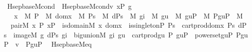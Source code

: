 \begin{isabellebody}
\ Hsep{\isacharunderscore}{\kern0pt}base{\isacharunderscore}{\kern0pt}M{\isacharunderscore}{\kern0pt}cond\ \ {\isachardoublequoteopen}Hsep{\isacharunderscore}{\kern0pt}base{\isacharunderscore}{\kern0pt}M{\isacharunderscore}{\kern0pt}cond{\isacharparenleft}{\kern0pt}v{\isacharcomma}{\kern0pt}\ xP{\isacharcomma}{\kern0pt}\ g{\isacharparenright}{\kern0pt}\ {\isasymequiv}\isanewline
\ \ \ {\isasymexists}x\ {\isasymin}\ M{\isachardot}{\kern0pt}\ {\isasymexists}P\ {\isasymin}\ M{\isachardot}{\kern0pt}\ {\isasymexists}domx\ {\isasymin}\ M{\isachardot}{\kern0pt}\ {\isasymexists}Ps\ {\isasymin}\ M{\isachardot}{\kern0pt}\ {\isasymexists}dPs\ {\isasymin}\ M{\isachardot}{\kern0pt}\ {\isasymexists}gi\ {\isasymin}\ M{\isachardot}{\kern0pt}\ {\isasymexists}gu\ {\isasymin}\ M{\isachardot}{\kern0pt}\ {\isasymexists}guP\ {\isasymin}\ M{\isachardot}{\kern0pt}\ {\isasymexists}PguP\ {\isasymin}\ M{\isachardot}{\kern0pt}\ \isanewline
\ \ pair{\isacharparenleft}{\kern0pt}{\isacharhash}{\kern0pt}{\isacharhash}{\kern0pt}M{\isacharcomma}{\kern0pt}\ x{\isacharcomma}{\kern0pt}\ P{\isacharcomma}{\kern0pt}\ xP{\isacharparenright}{\kern0pt}\ {\isasymand}\ is{\isacharunderscore}{\kern0pt}domain{\isacharparenleft}{\kern0pt}{\isacharhash}{\kern0pt}{\isacharhash}{\kern0pt}M{\isacharcomma}{\kern0pt}\ x{\isacharcomma}{\kern0pt}\ domx{\isacharparenright}{\kern0pt}\ {\isasymand}\ is{\isacharunderscore}{\kern0pt}singleton{\isacharprime}{\kern0pt}{\isacharparenleft}{\kern0pt}P{\isacharcomma}{\kern0pt}\ Ps{\isacharparenright}{\kern0pt}\ {\isasymand}\ cartprod{\isacharprime}{\kern0pt}{\isacharparenleft}{\kern0pt}domx{\isacharcomma}{\kern0pt}\ Ps{\isacharcomma}{\kern0pt}\ dPs{\isacharparenright}{\kern0pt}\ {\isasymand}\ image{\isacharparenleft}{\kern0pt}{\isacharhash}{\kern0pt}{\isacharhash}{\kern0pt}M{\isacharcomma}{\kern0pt}\ g{\isacharcomma}{\kern0pt}\ dPs{\isacharcomma}{\kern0pt}\ gi{\isacharparenright}{\kern0pt}\ {\isasymand}\ big{\isacharunderscore}{\kern0pt}union{\isacharparenleft}{\kern0pt}{\isacharhash}{\kern0pt}{\isacharhash}{\kern0pt}M{\isacharcomma}{\kern0pt}\ gi{\isacharcomma}{\kern0pt}\ gu{\isacharparenright}{\kern0pt}\ {\isasymand}\ cartprod{\isacharprime}{\kern0pt}{\isacharparenleft}{\kern0pt}gu{\isacharcomma}{\kern0pt}\ P{\isacharcomma}{\kern0pt}\ guP{\isacharparenright}{\kern0pt}\ {\isasymand}\ powerset{\isacharprime}{\kern0pt}{\isacharparenleft}{\kern0pt}guP{\isacharcomma}{\kern0pt}\ PguP{\isacharparenright}{\kern0pt}\ {\isasymand}\ v\ {\isasymin}\ PguP{\isachardoublequoteclose}\ \isanewline
\isanewline
{}\isamarkupfalse%
\ Hsep{\isacharunderscore}{\kern0pt}base{\isacharunderscore}{\kern0pt}M{\isacharunderscore}{\kern0pt}eq\ {\isacharcolon}{\kern0pt}\ \isanewline

\end{isabellebody}
